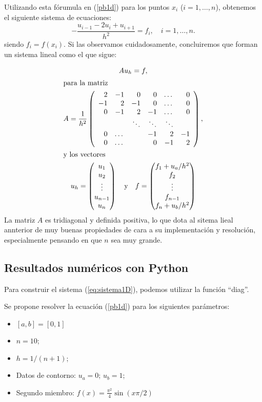 \documentclass[11pt,spanish,a4wide]{article}
\begin{document}
Utilizando esta fórumula en (\ref{pb1d}) para los puntos $x_i$
($i=1,\dots,n$), obtenemos el siguiente sistema de ecuaciones:
$$
-\frac{u_{i-1}-2u_i + u_{i+1}}{h^2} = f_i, \quad i=1,\dots,n.
$$
siendo $f_i=f(x_i)$.
Si las observamos cuidadosamente, concluiremos que forman un sistema
lineal como el que sigue:

\begin{gather}
Au_h=f,\label{eq:sistema1D} \\
\intertext{para la matriz}
A=\frac{1}{h^2}\left(
\begin{array}{rrrrrr}
   2 & -1 &  0 &  0 & \dots & 0 \\
  -1 &  2 & -1 &  0 & \dots & 0 \\
   0 & -1 &  2 & -1 & \dots & 0 \\
     &    & \ddots & \ddots & \ddots \\
   0 & \dots & & -1 & 2  & -1 \\
   0 & \dots & & 0 & -1 & 2  
 \end{array}
\right),
\\
\intertext{y los vectores}
u_h=
\begin{pmatrix}
  u_1 \\ u_2 \\ \vdots \\ u_{n-1} \\ u_n
\end{pmatrix}
%
\quad \mbox{y}  \quad
f=
\begin{pmatrix}
  f_1 + u_a/h^2 \\ f_2 \\ \vdots \\ f_{n-1} \\ f_n+u_b/h^2
\end{pmatrix}
\end{gather}
La matriz $A$ es tridiagonal y definida positiva, lo que dota al
sitema lieal annterior de muy buenas propiedades de cara a su
implementación y resolución, especialmente pensando en que $n$ sea muy
grande.

\subsection{Resultados numéricos con Python}
Para construir el sistema (\ref{eq:sistema1D}), podemos utilizar la
función ``diag''.

Se propone resolver la ecuación (\ref{pb1d}) para los siguientes
parámetros:
\begin{itemize}
\item $[a,b]=[0,1]$
\item $n= 10$;
\item $h = 1/(n+1)$;
\item Datos de contorno: $u_a=0$; $u_b=1$;
\item Segundo miembro: $f(x)=\frac{\pi^2}{4}  \sin(x\pi/2)$
\end{itemize}
\end{document}
